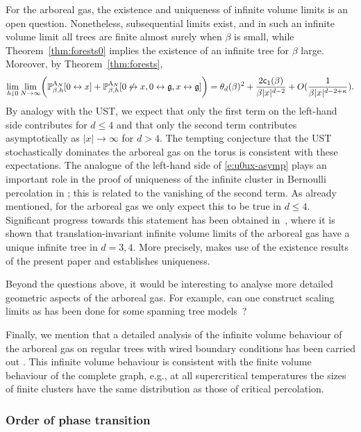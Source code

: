 \documentclass[11pt]{amsart}
\numberwithin{equation}{section}
\numberwithin{theorem}{section}
\newcommand{\ghost}{\mathfrak{g}}
\newcommand{\conn}{\leftrightarrow}
\newcommand{\nconn}{\not\leftrightarrow}
\newcommand{\1}{{\bf 1}}
\newcommand{\consta}{{\sf c}_1}
\begin{document}
For the arboreal gas, the existence and uniqueness of infinite volume
limits is an open question.  Nonetheless, subsequential limits exist,
and in such an infinite volume limit all trees are finite almost
surely when $\beta$ is small, while Theorem~\ref{thm:forests0} implies
the existence of an infinite tree for $\beta$ large.  Moreover, by
Theorem~\ref{thm:forests},
\begin{equation} \label{e:u0ux-asymp}
  \lim_{h\downarrow 0}\lim_{N\to\infty}\pbb{ \P_{\beta,h}^{\Lambda_N}[0 \conn x] + \P_{\beta,h}^{\Lambda_N}[0\nconn x, 0\conn\ghost, x\conn\ghost]}
  = \theta_d(\beta)^2 + \frac{2\consta(\beta)}{\beta |x|^{d-2}} + O(\frac{1}{\beta |x|^{d-2+\kappa}}).
\end{equation}
By analogy with the UST, we expect that only the first term on the
left-hand side contributes for $d\leq 4$ and that only the second term
contributes asymptotically as $|x|\to\infty$ for $d>4$.  The tempting
conjecture that the UST stochastically dominates the arboreal gas on
the torus is consistent with these expectations.  The analogue of the
left-hand side of \eqref{e:u0ux-asymp} plays an important role in the
proof of uniqueness of the infinite cluster in Bernoulli percolation
in \cite{MR901151}; this is related to the vanishing of the second
term.  As already mentioned, for the arboreal gas we only expect this
to be true in $d\leq 4$. Significant progress towards this
statement has been obtained in~\cite{2302.12224}, where it is shown that
translation-invariant infinite volume limits of the arboreal gas
have a unique infinite tree in $d=3,4$. More precisely, \cite{2302.12224}
makes use of the existence results of the
present paper and establishes uniqueness.

Beyond the questions above, it would be interesting to analyse
more detailed geometric aspects of the arboreal gas. For example, can one
construct scaling limits as has been done for some spanning tree models~\cite{MR1712629,MR1716768,MR3857861,MR4348685}?

Finally, we mention that a detailed analysis of the infinite volume
behaviour of the arboreal gas on regular trees with wired boundary
conditions has been carried out \cite{MR4402795,MR4460596}.  This infinite
volume behaviour is consistent with the finite volume behaviour of the
complete graph, e.g., at all supercritical temperatures the sizes of
finite clusters have the same distribution as those of critical
percolation.


\subsubsection*{Order of phase transition}
\end{document}

